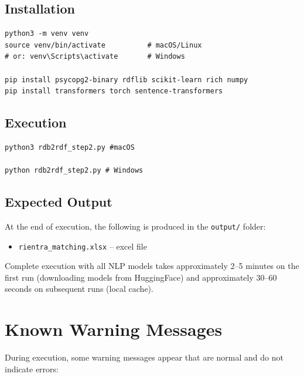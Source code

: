 \documentclass[12pt, a4paper]{report}
\begin{document}
\section{Installation}

\begin{lstlisting}[caption={Environment setup}]
python3 -m venv venv
source venv/bin/activate          # macOS/Linux
# or: venv\Scripts\activate       # Windows

pip install psycopg2-binary rdflib scikit-learn rich numpy
pip install transformers torch sentence-transformers
\end{lstlisting}

\section{Execution}

\begin{lstlisting}[caption={Running the script}]
python3 rdb2rdf_step2.py #macOS

python rdb2rdf_step2.py # Windows
\end{lstlisting}

\section{Expected Output}

At the end of execution, the following is produced in the
\texttt{output/} folder:

\begin{itemize}
  \item \texttt{rientra\_matching.xlsx} -- excel file 
\end{itemize}

Complete execution with all NLP models takes approximately 2--5
minutes on the first run (downloading models from HuggingFace) and
approximately 30--60 seconds on subsequent runs (local cache).

% 
\appendix
\chapter{Known Warning Messages}
% 

During execution, some warning messages appear that are
normal and do not indicate errors:
\end{document}
